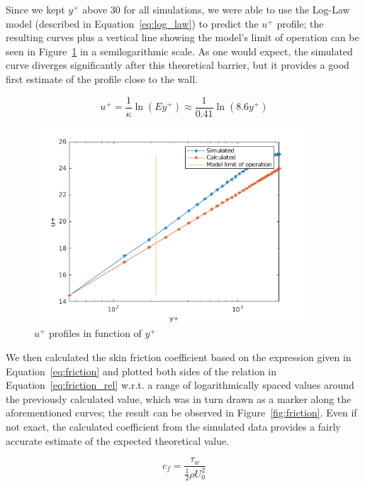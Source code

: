 \documentclass[12pt]{article}
\begin{document}
        Since we kept \( y^+ \) above 30 for all simulations, we were able to use the Log-Law model (described in Equation~\ref{eq:log_law}) to predict the \( u^+ \) profile; the resulting curves plus a vertical line showing the model's limit of operation can be seen in Figure~\ref{fig:u_plus} in a semilogarithmic scale. As one would expect, the simulated curve diverges significantly after this theoretical barrier, but it provides a good first estimate of the profile close to the wall.

        \begin{equation} \label{eq:log_law}
                u^+ = \frac{1}{\kappa} \ln(E y^+) \approx \frac{1}{0.41} \ln(8.6y^+)
        \end{equation}
        
        \begin{figure}
                \centering
                \includegraphics[width=0.9\textwidth]{Up_Profile.png}
                \caption{\( u^+ \) profiles in function of \( y^+ \)}
                \label{fig:u_plus}
        \end{figure}

        We then calculated the skin friction coefficient based on the expression given in Equation~\ref{eq:friction} and plotted both sides of the relation in Equation~\ref{eq:friction_rel} w.r.t. a range of logarithmically spaced values around the previously calculated value, which was in turn drawn as a marker along the aforementioned curves; the result can be observed in Figure~\ref{fig:friction}. Even if not exact, the calculated coefficient from the simulated data provides a fairly accurate estimate of the expected theoretical value.

        \begin{equation} \label{eq:friction}
                c_f = \frac{\tau_w}{\frac{1}{2} \rho U_0^2}
        \end{equation}
\end{document}

